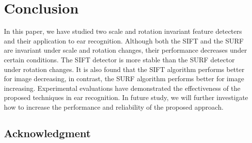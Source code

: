 \chapter{Conclusion} \label{sec:conc} In this paper, we have studied two scale and rotation invariant feature detecters and their application to ear recognition. Although both the SIFT and the SURF are invariant under scale and rotation changes, their performance decreases under certain conditions. The SIFT detector is more stable than the SURF detector under rotation changes. It is also found that the SIFT algorithm performs better for image decreasing, in contrast, the SURF algorithm performs better for image increasing. Experimental evaluations have demonstrated the effectiveness of the proposed techniques in ear recognition. In future study, we will further investigate how to increase the performance and reliability of the proposed approach.


\section*{Acknowledgment}

